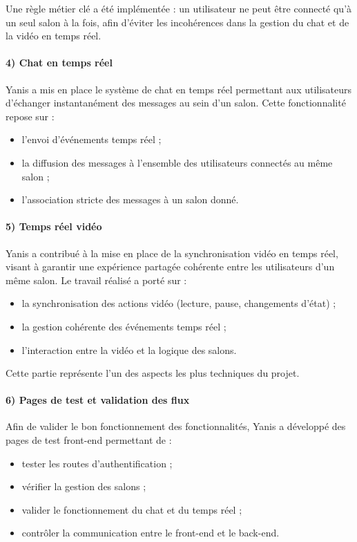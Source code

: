 \documentclass[12pt,a4paper]{report}
\begin{document}
Une règle métier clé a été implémentée : un utilisateur ne peut être connecté qu’à un seul salon à la fois, afin d’éviter les incohérences dans la gestion du chat et de la vidéo en temps réel.

\paragraph{4) Chat en temps réel}
Yanis a mis en place le système de chat en temps réel permettant aux utilisateurs d’échanger instantanément des messages au sein d’un salon. Cette fonctionnalité repose sur :
\begin{itemize}
  \item l’envoi d’événements temps réel ;
  \item la diffusion des messages à l’ensemble des utilisateurs connectés au même salon ;
  \item l’association stricte des messages à un salon donné.
\end{itemize}

\paragraph{5) Temps réel vidéo}
Yanis a contribué à la mise en place de la synchronisation vidéo en temps réel, visant à garantir une expérience partagée cohérente entre les utilisateurs d’un même salon. Le travail réalisé a porté sur :
\begin{itemize}
  \item la synchronisation des actions vidéo (lecture, pause, changements d’état) ;
  \item la gestion cohérente des événements temps réel ;
  \item l’interaction entre la vidéo et la logique des salons.
\end{itemize}

Cette partie représente l’un des aspects les plus techniques du projet.

\paragraph{6) Pages de test et validation des flux}
Afin de valider le bon fonctionnement des fonctionnalités, Yanis a développé des pages de test front-end permettant de :
\begin{itemize}
  \item tester les routes d’authentification ;
  \item vérifier la gestion des salons ;
  \item valider le fonctionnement du chat et du temps réel ;
  \item contrôler la communication entre le front-end et le back-end.
\end{itemize}
\end{document}

